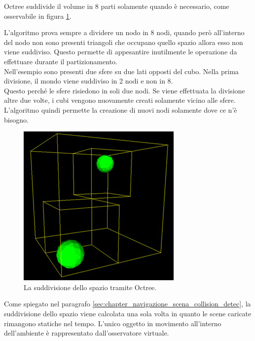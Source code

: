 Octree suddivide il volume in 8 parti solamente quando è necessario, come osservabile in figura \ref{fig:navigazione_scena_collision_full_octree}.

L’algoritmo prova sempre a dividere un nodo in 8 nodi, quando però all’interno del nodo non sono presenti triangoli che occupano quello spazio allora esso non viene suddiviso. 
Questo permette di appesantire inutilmente le operazione da effettuare durante il partizionamento.
\\
Nell’esempio sono presenti due sfere su due lati opposti del cubo.  Nella prima divisione, il mondo viene suddiviso in 2 nodi e non in 8. 
\\
Questo perché le sfere risiedono in soli due nodi.
Se viene effettuata la divisione altre due volte, i cubi vengono nuovamente creati solamente vicino alle sfere. L’algoritmo quindi permette la creazione di nuovi nodi solamente dove ce n’è bisogno.

\begin{figure}[htb]
 \centering
 \includegraphics[width=1\linewidth]{images/chapter_navigazione_scena/div_2sfere.png}\hfill
 \caption[Octree e la suddivisione dello spazio.]{La suddivisione dello spazio tramite Octree.}
 \label{fig:navigazione_scena_collision_full_octree}
\end{figure}

Come spiegato nel paragrafo \ref{sec:chapter_navigazione_scena_collision_detec}, la suddivisione dello spazio viene calcolata una sola volta in quanto le scene caricate rimangono statiche nel tempo. L’unico oggetto in movimento all’interno dell’ambiente è rappresentato dall’osservatore virtuale.

